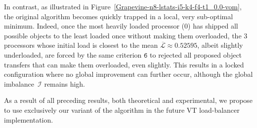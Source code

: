 In contrast, as illustrated in
Figure~\ref{Grapevine-n8-lstats-i5-k4-f4-t1_0.0-vom}, the original
algorithm becomes quickly trapped in a local, very sub-optimal minimum.
Indeed, once the most heavily loaded processor ($0$) has shipped all
possible objects to the least loaded once without making them
overloaded, the $3$ processors whose initial load is closest to the
mean $\overline{\mathcal{L}}\approx0.52595$, albeit slightly
underloaded, are forced by the same criterion $\texttt{6}$
to rejected all proposed object transfers that can make them
overloaded, even slightly.
This results in a locked configuration where no global improvement can
further occur, although the global imbalance~$\mathcal{I}$ remains
high.

As a result of all preceding results, both theoretical and
experimental, we propose to use exclusively our variant of the
algorithm in the future \textsf{VT} load-balancer implementation.